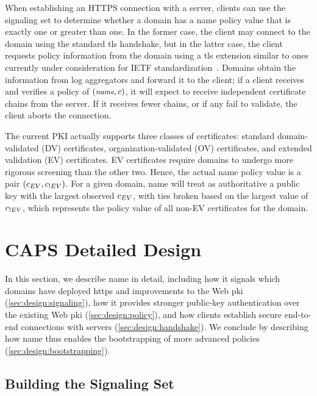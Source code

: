 When establishing an HTTPS connection with a server, clients can use the
signaling set to determine whether a domain has a \ac{name} policy value that is
exactly one or greater than one. In the former case, the client may connect to
the domain using the standard \ac{tls} handshake, but in the latter case, the
client requests policy information from the domain using a \ac{tls} extension
similar to ones currently under consideration for IETF 
standardization~\cite{rfc-extra-cert-1, rfc-extra-cert-2}.
Domains obtain the information from log aggregators and forward it to the
client; if a client receives and verifies a policy of $(\small{\emph{name}}, c)$, it
will expect to receive \policy independent certificate chains from the server.
If it receives fewer chains, or if any fail to validate, the client aborts
the connection.

The current PKI actually supports three classes of certificates: standard
domain-validated (DV) certificates, organization-validated (OV) certificates,
and extended validation (EV) certificates. EV certificates require domains to
undergo more rigorous screening than the other two. Hence, the actual \ac{name}
policy value is a pair $(c_{EV}, c_{!EV})$. For a given domain,
\ac{name} will treat as authoritative a public key with the largest observed
$c_{EV}$, with ties broken based on the largest value of $c_{!EV}$,
which represents the policy value of all non-EV certificates for the domain.


\section{CAPS Detailed Design}

In this section, we describe \ac{name} in detail, including how it signals which
domains have deployed \ac{https} and improvements to the Web \ac{pki}
(\autoref{sec:design:signaling}), how it provides stronger public-key
authentication over the existing Web \ac{pki} (\autoref{sec:design:policy}), and
how clients establish secure end-to-end connections with servers
(\autoref{sec:design:handshake}). We conclude by describing how \ac{name} thus
enables the bootstrapping of more advanced policies
(\autoref{sec:design:bootstrapping}).

\subsection{Building the Signaling Set}
\label{sec:design:signaling}

